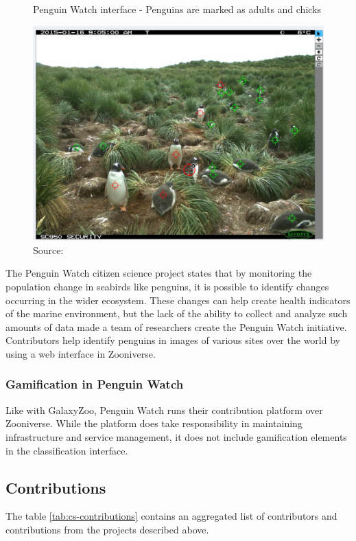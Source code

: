 \begin{figure}[ht]
    \centering
    \caption{Penguin Watch interface - Penguins are marked as adults and chicks}
    \includegraphics[width=0.8\linewidth]{images/background/penguinwatch.jpg}
    \caption*{Source: \cite{penguin2015watch}}
    \label{fig:oldweather-logbook}
\end{figure}

The Penguin Watch citizen science project states that by monitoring the population change in seabirds like penguins, it is possible to identify changes occurring in the wider ecosystem. These changes can help create health indicators of the marine environment, but the lack of the ability to collect and analyze such amounts of data made a team of researchers create the Penguin Watch initiative. Contributors help identify penguins in images of various sites over the world by using a web interface in Zooniverse.

\subsubsection{Gamification in Penguin Watch}

Like with GalaxyZoo, Penguin Watch runs their contribution platform over Zooniverse. While the platform does take responsibility in maintaining infrastructure and service management, it does not include gamification elements in the classification interface.

\subsection{Contributions}

The table \ref{tab:cs-contributions} contains an aggregated list of contributors and contributions from the projects described above.


